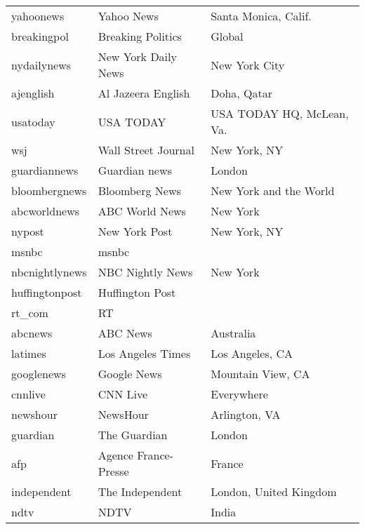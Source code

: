 \begin{longtable}{l|l|l}
 yahoonews        &  Yahoo News            &  Santa Monica, Calif.        \\
 breakingpol      &  Breaking Politics     &  Global                      \\
 nydailynews      &  New York Daily News   &  New York City               \\
 ajenglish        &  Al Jazeera English    &  Doha, Qatar                 \\
 usatoday         &  USA TODAY             &  USA TODAY HQ, McLean, Va.   \\
 wsj              &  Wall Street Journal   &  New York, NY                \\
 guardiannews     &  Guardian news         &  London                      \\
 bloombergnews    &  Bloomberg News        &  New York and the World      \\
 abcworldnews     &  ABC World News        &  New York                    \\
 nypost           &  New York Post         &  New York, NY                \\
 msnbc            &  msnbc                 &                              \\
 nbcnightlynews   &  NBC Nightly News      &  New York                    \\
 huffingtonpost   &  Huffington Post       &                              \\
 rt\_com           &  RT                    &                              \\
 abcnews          &  ABC News              &  Australia                   \\
 latimes          &  Los Angeles Times     &  Los Angeles, CA             \\
 googlenews       &  Google News           &  Mountain View, CA           \\
 cnnlive          &  CNN Live              &  Everywhere                  \\
 newshour         &  NewsHour              &  Arlington, VA               \\
 guardian         &  The Guardian          &  London                      \\
 afp              &  Agence France-Presse  &  France                      \\
 independent      &  The Independent       &  London, United Kingdom      \\
 ndtv             &  NDTV                  &  India                       \\

\end{longtable}
